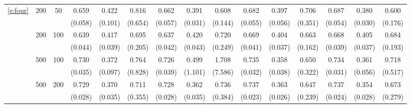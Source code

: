 \begin{table}[htbp]
{\begin{tabular}{ccc cccccc cccccc}
 \ref{e:four} & 200 & 50 & 0.659 & 0.422 & 0.816 & 0.662 & 0.391 & 0.608 & 0.682 & 0.397 & 0.706 & 0.687 & 0.380 & 0.600 \\
 &  &  & (0.058) & (0.101) & (0.654) & (0.057) & (0.031) & (0.144) & (0.055) & (0.056) & (0.351) & (0.054) & (0.030) & (0.176) \\
 & 200 & 100 & 0.639 & 0.417 & 0.695 & 0.637 & 0.420 & 0.720 & 0.669 & 0.404 & 0.663 & 0.668 & 0.405 & 0.684 \\
 &  &  & (0.044) & (0.039) & (0.205) & (0.042) & (0.043) & (0.249) & (0.041) & (0.037) & (0.162) & (0.039) & (0.037) & (0.193) \\
 & 500 & 100 & 0.730 & 0.372 & 0.764 & 0.726 & 0.499 & 1.708 & 0.735 & 0.358 & 0.650 & 0.734 & 0.361 & 0.718 \\
 &  &  & (0.035) & (0.097) & (0.828) & (0.039) & (1.101) & (7.586) & (0.032) & (0.038) & (0.322) & (0.031) & (0.056) & (0.517) \\
 & 500 & 200 & 0.729 & 0.370 & 0.711 & 0.728 & 0.362 & 0.736 & 0.737 & 0.363 & 0.647 & 0.737 & 0.354 & 0.673 \\
 &  &  & (0.028) & (0.035) & (0.355) & (0.028) & (0.035) & (0.384) & (0.023) & (0.026) & (0.239) & (0.024) & (0.028) & (0.279)\\	\bottomrule
\end{tabular}}
\end{table}

